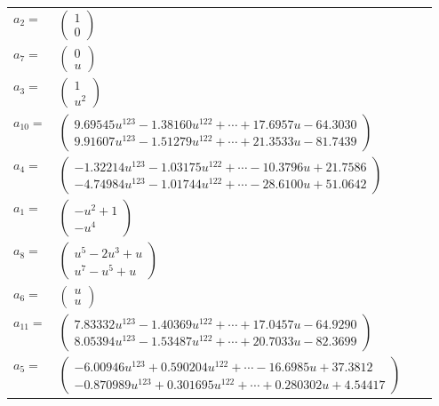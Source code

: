 \documentclass[1p]{elsarticle_modified}
\theoremstyle{definition}
\begin{document}
\begin{tabular}{m{7pt} m{180pt} m{7pt} m{180pt} }
\flushright $a_{2}=$&$\begin{pmatrix}1\\0\end{pmatrix}$ \\
\flushright $a_{7}=$&$\begin{pmatrix}0\\u\end{pmatrix}$ \\
\flushright $a_{3}=$&$\begin{pmatrix}1\\u^2\end{pmatrix}$ \\
\flushright $a_{10}=$&$\begin{pmatrix}9.69545 u^{123}-1.38160 u^{122}+\cdots+17.6957 u-64.3030\\9.91607 u^{123}-1.51279 u^{122}+\cdots+21.3533 u-81.7439\end{pmatrix}$ \\
\flushright $a_{4}=$&$\begin{pmatrix}-1.32214 u^{123}-1.03175 u^{122}+\cdots-10.3796 u+21.7586\\-4.74984 u^{123}-1.01744 u^{122}+\cdots-28.6100 u+51.0642\end{pmatrix}$ \\
\flushright $a_{1}=$&$\begin{pmatrix}- u^2+1\\- u^4\end{pmatrix}$ \\
\flushright $a_{8}=$&$\begin{pmatrix}u^5-2 u^3+u\\u^7- u^5+u\end{pmatrix}$ \\
\flushright $a_{6}=$&$\begin{pmatrix}u\\u\end{pmatrix}$ \\
\flushright $a_{11}=$&$\begin{pmatrix}7.83332 u^{123}-1.40369 u^{122}+\cdots+17.0457 u-64.9290\\8.05394 u^{123}-1.53487 u^{122}+\cdots+20.7033 u-82.3699\end{pmatrix}$ \\
\flushright $a_{5}=$&$\begin{pmatrix}-6.00946 u^{123}+0.590204 u^{122}+\cdots-16.6985 u+37.3812\\-0.870989 u^{123}+0.301695 u^{122}+\cdots+0.280302 u+4.54417\end{pmatrix}$ \\

\end{tabular}
\end{document}
